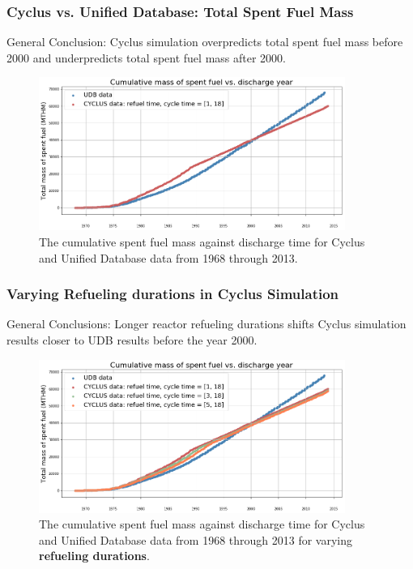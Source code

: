 \begin{frame}
    \frametitle{Cyclus vs. Unified Database: Total Spent Fuel Mass}
    General Conclusion: Cyclus simulation overpredicts total spent fuel mass 
    before 2000 and underpredicts total spent fuel mass after 2000. 

    \begin{figure}[htbp!]
      \begin{center}
        \includegraphics[height=5cm]{../figures/cumulative_mass_udb_cyclus}
      \end{center}
            \caption{The cumulative spent fuel mass against discharge time
            for Cyclus and Unified Database data from 1968 through 2013.}
      \label{fig:totalmass}
    \end{figure}

  \end{frame}

\begin{frame}
    \frametitle{Varying Refueling durations in Cyclus Simulation}
    General Conclusions: Longer reactor refueling durations shifts Cyclus simulation results closer to 
    UDB results before the year 2000. 
    \begin{figure}[htbp!]
        \begin{center}
          \includegraphics[height=5cm]{../figures/cumulative_mass_udb_cyclus_refueltime}
        \end{center}
        \caption{The cumulative spent fuel mass against discharge time
        for Cyclus and Unified Database data from 1968 through 2013 for varying
        \textbf{refueling durations}.}
    \end{figure}  
\end{frame}

